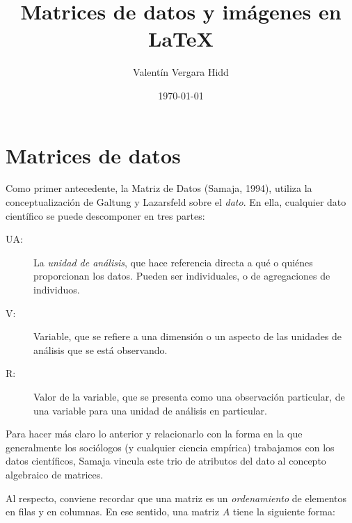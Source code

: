 \documentclass[letterpaper,11pt]{article}
\title{Matrices de datos y imágenes en \LaTeX{}}
\author{Valentín Vergara Hidd}
\date{\today}
\begin{document}

\maketitle


\section{Matrices de datos}

Como primer antecedente, la Matriz de Datos (Samaja, 1994), utiliza la conceptualización de Galtung y Lazarsfeld sobre el \emph{dato}. En ella, cualquier dato científico se puede descomponer en tres partes:
\begin{description}
\item[UA: ] La \emph{unidad de análisis}, que hace referencia directa a qué o quiénes proporcionan los datos. Pueden ser individuales, o de agregaciones de individuos.
\item[V: ] Variable, que se refiere a una dimensión o un aspecto de las unidades de análisis que se está observando.
\item[R: ] Valor de la variable, que se presenta como una observación particular, de una variable para una unidad de análisis en particular. 
\end{description}

Para hacer más claro lo anterior y relacionarlo con la forma en la que generalmente los sociólogos (y cualquier ciencia empírica) trabajamos con los datos científicos, Samaja vincula este trio de atributos del dato al concepto algebraico de matrices.

Al respecto, conviene recordar que una matriz es un \emph{ordenamiento} de elementos en filas y en columnas. En ese sentido, una matriz $A$ tiene la siguiente forma:
\end{document}
